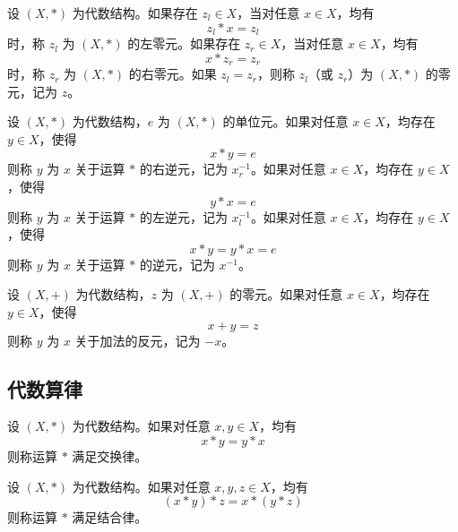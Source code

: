 \vspace{1em}

\begin{definition}
    设 $ (X,\ast) $ 为代数结构。如果存在 $ z_l\in X $，当对任意 $ x\in X $，均有
    \[
        z_l \ast x = z_l
    \]
    时，称 $ z_l $ 为 $ (X,\ast) $ 的左零元。如果存在 $ z_r\in X $，当对任意 $ x\in X $，均有
    \[
        x \ast z_r = z_r
    \]
    时，称 $ z_r $ 为 $ (X,\ast) $ 的右零元。如果 $ z_l = z_r $，则称 $ z_l $（或 $ z_r $）为 $ (X,\ast) $ 的零元，记为 $ z $。
\end{definition}

\vspace{1em}

\begin{definition}
    设 $ (X,\ast) $ 为代数结构，$ e $ 为 $ (X,\ast) $ 的单位元。如果对任意 $ x\in X $，均存在 $ y\in X $，使得
    \[
        x \ast y = e
    \]
    则称 $ y $ 为 $ x $ 关于运算 $ \ast $ 的右逆元，记为 $ x^{-1}_r $。如果对任意 $ x\in X $，均存在 $ y\in X $，使得
    \[
        y \ast x = e
    \]
    则称 $ y $ 为 $ x $ 关于运算 $ \ast $ 的左逆元，记为 $ x^{-1}_l $。如果对任意 $ x\in X $，均存在 $ y\in X $，使得
    \[
        x \ast y = y \ast x = e
    \]
    则称 $ y $ 为 $ x $ 关于运算 $ \ast $ 的逆元，记为 $ x^{-1} $。
\end{definition}

\vspace{1em}

\begin{definition}
    设 $ (X,+) $ 为代数结构，$ z $ 为 $ (X,+) $ 的零元。如果对任意 $ x\in X $，均存在 $ y\in X $，使得
    \[
        x + y = z
    \]
    则称 $ y $ 为 $ x $ 关于加法的反元，记为 $ -x $。
\end{definition}

\vspace{1em}

\subsection{代数算律}
\begin{definition}
    设 $ (X,\ast) $ 为代数结构。如果对任意 $ x,y\in X $，均有
    \[
        x \ast y = y \ast x
    \]
    则称运算 $ \ast $ 满足交换律。
\end{definition}
\vspace{1em}

\begin{definition}
    设 $ (X,\ast) $ 为代数结构。如果对任意 $ x,y,z\in X $，均有
    \[
        (x \ast y) \ast z = x \ast (y \ast z)
    \]
    则称运算 $ \ast $ 满足结合律。
\end{definition}
\vspace{1em}

